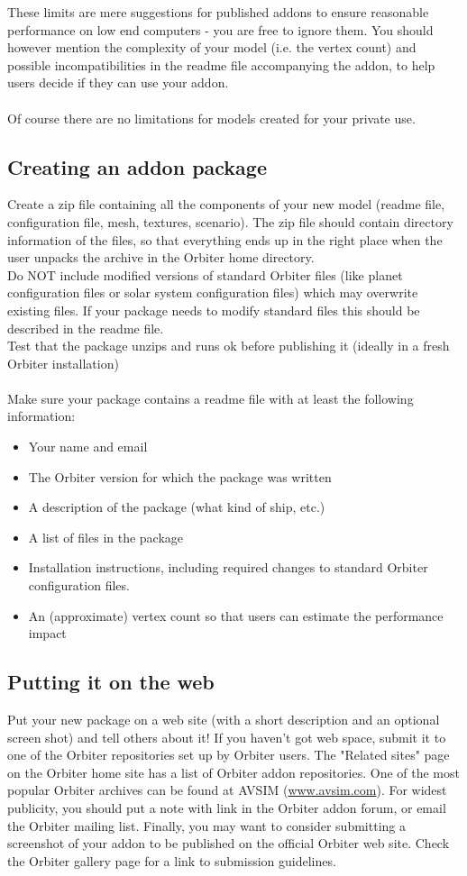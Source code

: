 \documentclass[Orbiter Developer Manual.tex]{subfiles}
\begin{document}
\noindent
These limits are mere suggestions for published addons to ensure reasonable performance on low end computers - you are free to ignore them. You should however mention the complexity of your model (i.e. the vertex count) and possible incompatibilities in the readme file accompanying the addon, to help users decide if they can use your addon.\\
\\
Of course there are no limitations for models created for your private use.


\subsection{Creating an addon package}
Create a zip file containing all the components of your new model (readme file, configuration file, mesh, textures, scenario). The zip file should contain directory information of the files, so that everything ends up in the right place when the user unpacks the archive in the Orbiter home directory.\\
Do NOT include modified versions of standard Orbiter files (like planet configuration files or solar system configuration files) which may overwrite existing files. If your package needs to modify standard files this should be described in the readme file.\\
Test that the package unzips and runs ok before publishing it (ideally in a fresh Orbiter installation)\\
\\
Make sure your package contains a readme file with at least the following information:

\begin{itemize}
\item Your name and email
\item The Orbiter version for which the package was written
\item A description of the package (what kind of ship, etc.)
\item A list of files in the package
\item Installation instructions, including required changes to standard Orbiter configuration files.
\item An (approximate) vertex count so that users can estimate the performance impact
\end{itemize}

\subsection{Putting it on the web}
Put your new package on a web site (with a short description and an optional screen shot) and tell others about it! If you haven't got web space, submit it to one of the Orbiter repositories set up by Orbiter users. The "Related sites" page on the Orbiter home site has a list of Orbiter addon repositories. One of the most popular Orbiter archives can be found at AVSIM (\url{www.avsim.com}). For widest publicity, you should put a note with link in the Orbiter addon forum, or email the Orbiter mailing list. Finally, you may want to consider submitting a screenshot of your addon to be published on the official Orbiter web site. Check the Orbiter gallery page for a link to submission guidelines.
\end{document}
